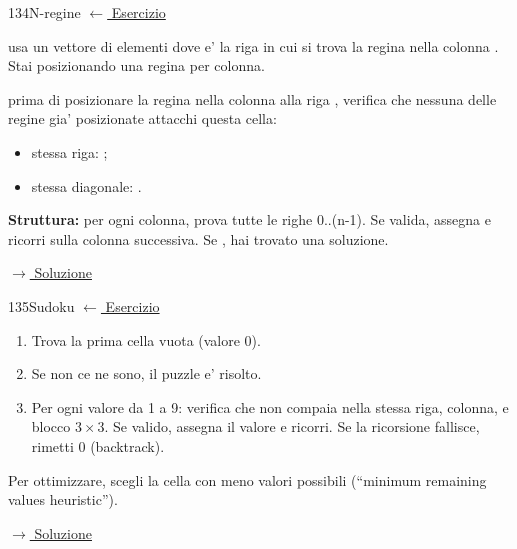 \label{hint:134}
\begin{hintbox}{134}{N-regine}
\small\color{black!55}\hyperref[ex:134]{$\leftarrow$ Esercizio}\normalsize\color{black}

 usa un vettore di  elementi dove
 e' la riga in cui si trova la regina
nella colonna . Stai posizionando una regina per colonna.

 prima di posizionare la regina nella colonna 
alla riga , verifica che nessuna delle regine gia'
posizionate attacchi questa cella:
\begin{itemize}[leftmargin=2em]
  \item stessa riga: ;
  \item stessa diagonale: .
\end{itemize}

\textbf{Struttura:} per ogni colonna, prova tutte le righe 0..(n-1).
Se valida, assegna e ricorri sulla colonna successiva.
Se , hai trovato una soluzione.

\small\color{black!55}\hyperref[sol:134]{$\rightarrow$ Soluzione}\normalsize\color{black}
\end{hintbox}

\label{hint:135}
\begin{hintbox}{135}{Sudoku}
\small\color{black!55}\hyperref[ex:135]{$\leftarrow$ Esercizio}\normalsize\color{black}

\begin{enumerate}[leftmargin=2em]
  \item Trova la prima cella vuota (valore 0).
  \item Se non ce ne sono, il puzzle e' risolto.
  \item Per ogni valore da 1 a 9:
        verifica che non compaia nella stessa riga, colonna,
        e blocco $3 \times 3$.
        Se valido, assegna il valore e ricorri.
        Se la ricorsione fallisce, rimetti 0 (backtrack).
\end{enumerate}

Per ottimizzare, scegli la cella con meno valori possibili
(``minimum remaining values heuristic'').

\small\color{black!55}\hyperref[sol:135]{$\rightarrow$ Soluzione}\normalsize\color{black}
\end{hintbox}

